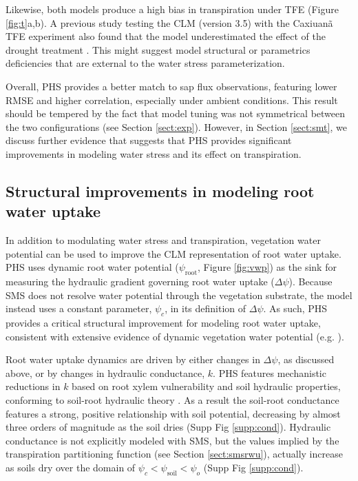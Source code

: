 \documentclass[draft,linenumbers]{agujournal}
\begin{document}
    Likewise, both models produce a high bias in transpiration under TFE (Figure \ref{fig:t}a,b). 
    A previous study testing the CLM (version 3.5) with the Caxiuan\~a TFE experiment also found that the model underestimated the effect of the drought treatment  \citep{powell2013}.
    This might suggest model structural or parametrics deficiencies that are external to the water stress parameterization.
    
    Overall, PHS provides a better match to sap flux observations, featuring lower RMSE and higher correlation, especially under ambient conditions. This result should be tempered by the fact that model tuning was not symmetrical between the two configurations (see Section \ref{sect:exp}).
    However, in Section \ref{sect:smt}, we discuss further evidence that suggests that PHS provides significant improvements in modeling water stress and its effect on transpiration.
    
    
\subsection{Structural improvements in modeling root water uptake}
    In addition to modulating water stress and transpiration, vegetation water potential can be used to improve the CLM representation of root water uptake.
PHS uses dynamic root water potential ($\psi_{\text{root}}$, Figure \ref{fig:vwp}) as the sink for measuring the hydraulic gradient governing root water uptake ($\Delta\psi$).
Because SMS does not resolve water potential through the vegetation substrate, the model instead uses a constant parameter, $\psi_c$, in its definition of $\Delta\psi$.
    As such, PHS provides a critical structural improvement for modeling root water uptake, consistent with extensive evidence of dynamic vegetation water potential (e.g. \cite{fisher2006}).

    Root water uptake dynamics are driven by either changes in $\Delta\psi$, as discussed above, or by changes in hydraulic conductance, $k$. 
    PHS features mechanistic reductions in $k$ based on root xylem vulnerability and soil hydraulic properties, 
    conforming to soil-root hydraulic theory \citep{cai2014,warren2015}.
    As a result the soil-root conductance features a strong, positive relationship with soil potential, decreasing by almost three orders of magnitude as the soil dries (Supp Fig \ref{supp:cond}).
    Hydraulic conductance is not explicitly modeled with SMS, but the values implied by the transpiration partitioning function (see Section \ref{sect:smsrwu}), actually increase as soils dry over the domain of $\psi_c<\psi_{\text{soil}}<\psi_o$ (Supp Fig \ref{supp:cond}).
    
\end{document}
